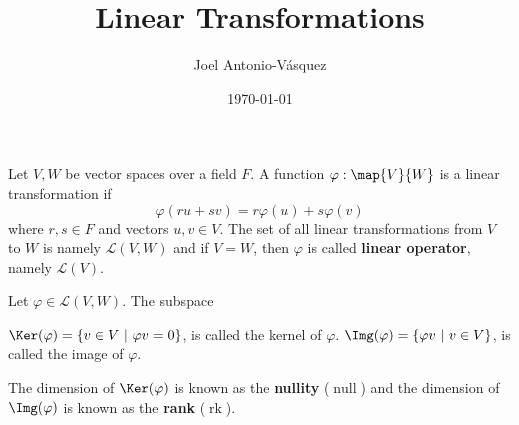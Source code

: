 \documentclass[11pt]{scrartcl}
\newcommand{\CL}{\mathcal L}
\DeclareMathOperator{\Null}{null}
\DeclareMathOperator{\rk}{rk}
\begin{document}
\title{Linear Transformations}
\author{Joel Antonio-V\'asquez}
\date{\today}
\maketitle

\begin{definition*}
  Let $V, W$ be vector spaces over a field $F$. A function $\varphi: \map{V}{W}$ is a linear transformation if
$$
\varphi(ru + sv) = r\varphi(u) + s\varphi(v)
$$
where $r,s \in F$ and vectors $u, v \in V$. The set of all linear transformations from $V$ to $W$ is namely $\CL(V, W)$ and if $V = W$, then $\varphi$ is called \textbf{linear operator}, namely $\CL(V)$.
\begin{definition*} Let $\varphi \in \CL(V, W)$. The subspace
  \begin{itemize}
      \ii $\Ker(\varphi) = \{v \in V \ | \ \varphi v = 0\}$, is called the kernel of $\varphi$.
      \ii $\Img(\varphi) = \{\varphi v \ | \ v \in V\}$, is called the image of $\varphi$.
  \end{itemize}
  The dimension of $\Ker(\varphi)$ is known as the \textbf{nullity} ($\Null$) and the dimension of $\Img(\varphi)$ is known as the \textbf{rank} ($\rk$).
\end{definition*}


\end{definition*}
\end{document}
